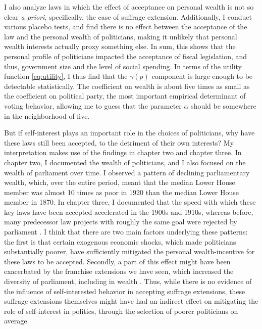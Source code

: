 I also analyze laws in which the effect of acceptance on personal wealth is not so clear \textit{a priori}, specifically, the case of suffrage extension. Additionally, I conduct various placebo tests, and find there is no effect between the acceptance of the law and the personal wealth of politicians, making it unlikely that personal wealth interests actually proxy something else. In sum, this shows that the personal profile of politicians impacted the acceptance of fiscal legislation, and thus, government size and the level of social spending. In terms of the utility function \ref{eq:utility}, I thus find that the $\gamma (p)$ component is large enough to be detectable statistically. The coefficient on wealth is about five times as small as the coefficient on political party, the most important empirical determinant of voting behavior, allowing me to guess that the parameter $\alpha$ should be somewhere in the neighborhood of five. 

But if self-interest plays an important role in the choices of politicians, why have these laws still been accepted, to the detriment of their own interests? My interpretation makes use of the findings in chapter two and chapter three. In chapter two, I documented the wealth of politicians, and I also focused on the wealth of parliament over time. I observed a pattern of declining parliamentary wealth, which, over the entire period, meant that the median Lower House member was almost 10 times as poor in 1920 than the median Lower House member in 1870. In chapter three, I documented that the speed with which these key laws have been accepted accelerated in the 1900s and 1910s, whereas before, many predecessor law projects with roughly the same goal were rejected by parliament \citep{smit2002omwille, van2013eerste}. I think that there are two main factors underlying these patterns: the first is that certain exogenous economic shocks, which made politicians substantially poorer, have sufficiently mitigated the personal wealth-incentive for these laws to be accepted. Secondly, a part of this effect might have been exacerbated by the franchise extensions we have seen, which increased the diversity of parliament, including in wealth \citep{van1983toegang}. Thus, while there is no evidence of the influence of self-interested behavior in accepting suffrage extensions, these suffrage extensions themselves might have had an indirect effect on mitigating the role of self-interest in politics, through the selection of poorer politicians on average.

